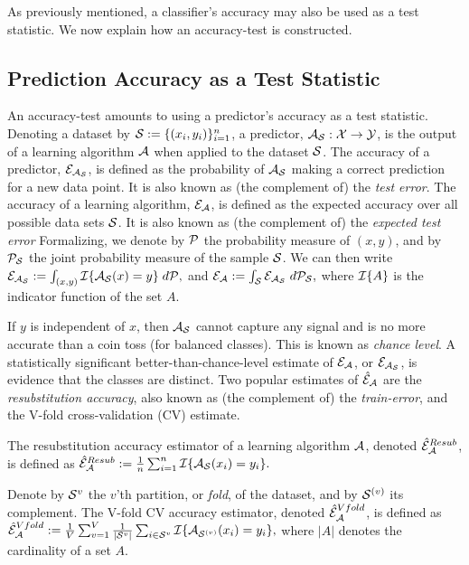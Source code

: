 \documentclass[]{bio}
\begin{document}
As previously mentioned, a classifier's accuracy may also be used as a test statistic. 
We now explain how an accuracy-test is constructed. 


\subsection{Prediction Accuracy as a Test Statistic}
An accuracy-test amounts to using a predictor's accuracy as a test statistic.  
Denoting a dataset by $\mathcal{S}:=\{(x_i,y_i)\}_{i=1}^n$, a predictor, $\mathcal{A}_{\mathcal{S}}:\mathcal{X} \to \mathcal{Y}$, is the output of a learning algorithm $\mathcal{A}$ when applied to the dataset $\mathcal{S}$. 
The accuracy of a predictor, $\mathcal{E}_{\mathcal{A}_{\mathcal{S}}}$, is defined as the probability of $\mathcal{A}_{\mathcal{S}}$ making a correct prediction for a new data point. 
It is also known as (the complement of) the \emph{test error}.
The accuracy of a learning algorithm, $\mathcal{E}_{\mathcal{A}}$, is defined as the expected accuracy over all possible data sets $\mathcal{S}$. 
It is also known as (the complement of) the \emph{expected test error}
Formalizing, we denote by $\mathcal{P}$ the probability measure of $(x, y)$, and by $\mathcal{P}_{\mathcal{S}}$ the joint probability measure of the sample $\mathcal{S}$. 
We can then write $\mathcal{E}_{\mathcal{A}_{\mathcal{S}}}:=\int_{(x,y)} \mathcal{I}{\{ \mathcal{A}_{\mathcal{S}}(x)=y \}} \; d\mathcal{P},$
and
$\mathcal{E}_{\mathcal{A}}:=\int_{\mathcal{S}} \mathcal{E}_{\mathcal{A}_{\mathcal{S}}} \; d\mathcal{P}_{\mathcal{S}},$
where $\mathcal{I}{\{ A \}}$ is the indicator function of the set $A$. 

If $y$ is independent of $x$, then $\mathcal{A}_{\mathcal{S}}$ cannot capture any signal and is no more accurate than a coin toss (for balanced classes). 
This is known as \emph{chance level}.
A statistically significant better-than-chance-level estimate of $\mathcal{E}_{\mathcal{A}}$, or $\mathcal{E}_{\mathcal{A}_{\mathcal{S}}}$, is evidence that the classes are distinct. 
Two popular estimates of $\hat{\mathcal{E}}_{\mathcal{A}}$ are the \emph{resubstitution accuracy}, also known as (the complement of) the \emph{train-error}, and the V-fold cross-validation (CV) estimate.
\begin{definition}
	\label{def:resubstitution}
	The resubstitution accuracy estimator of a learning algorithm $\mathcal{A}$, denoted $\hat{\mathcal{E}}_{\mathcal{A}}^{Resub}$,  is defined as
	$\hat{\mathcal{E}}_{\mathcal{A}}^{Resub} := \frac 1n \sum_{i=1}^{n} \mathcal{I}{\{ \mathcal{A}_{\mathcal{S}}(x_i)=y_i \}}.$
\end{definition}


\begin{definition}
	\label{def:v-fold}
	Denote by $\mathcal{S}^{v}$ the $v$'th partition, or \emph{fold}, of the dataset, and by $\mathcal{S}^{(v)}$ its complement.
	The V-fold CV accuracy estimator, denoted $\hat{\mathcal{E}}_{\mathcal{A}}^{Vfold}$, is defined as 	
	$\hat{\mathcal{E}}_{\mathcal{A}}^{Vfold} := 
	\frac 1V \sum_{v=1}^{V} \frac{1}{|\mathcal{S}^v|} \sum_{i \in \mathcal{S}^{v}} \mathcal{I}{\{ \mathcal{A}_{\mathcal{S}^{(v)}}(x_i)=y_i \}},$
	where $|A|$ denotes the cardinality of a set $A$.
\end{definition}
\end{document}
